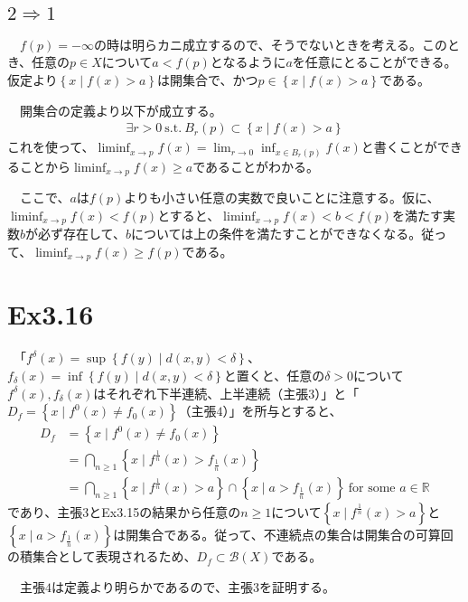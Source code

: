 \documentclass{article}
\begin{document}
\subsection{$2\Rightarrow 1$}
　$f(p) = -\infty$の時は明らカニ成立するので、そうでないときを考える。このとき、任意の$p\in X$について$a < f(p)$となるように$a$を任意にとることができる。仮定より$\left\{ x\mid f(x) > a \right\}$は開集合で、かつ$p \in \left\{ x\mid f(x) > a \right\}$である。

　開集合の定義より以下が成立する。
\begin{align*}
	\exists r>0\ \text{s.t.}\ B_{r}(p) \subset \left\{ x\mid f(x) > a \right\}
\end{align*}
これを使って、$\liminf_{x\to p} f(x) = \lim_{r\to 0} \inf_{x\in B_{r}(p)} f(x)$と書くことができることから$\liminf_{x\to p} f(x) \geq a$であることがわかる。

　ここで、$a$は$f(p)$よりも小さい任意の実数で良いことに注意する。仮に、$\liminf_{x\to p} f(x) < f(p)$とすると、$\liminf_{x\to p} f(x) < b < f(p)$を満たす実数$b$が必ず存在して、$b$については上の条件を満たすことができなくなる。従って、$\liminf_{x\to p} f(x) \geq f(p)$である。

\section{Ex3.16}
　「$f^{\delta}(x) = \sup\left\{ f(y)\mid d(x,y) <\delta \right\}$、$f_{\delta}(x) = \inf\left\{ f(y)\mid d(x,y) <\delta \right\}$と置くと、任意の$\delta > 0$について$f^{\delta}(x), f_{\delta}(x)$はそれぞれ下半連続、上半連続（主張$3$）」と「$D_f = \left\{ x \mid f^0(x) \neq f_0(x)\right\}$（主張$4$）」を所与とすると、
\begin{align*}
	D_f &= \left\{ x \mid f^0(x) \neq f_0(x)\right\}\\
	& = \bigcap_{n\geq 1} \left\{ x \mid f^{\frac{1}{n}}(x) > f_{\frac{1}{n}}(x)\right\}\\
	& = \bigcap_{n\geq 1} \left\{ x \mid f^{\frac{1}{n}}(x) > a\right\} \cap \left\{ x\mid a >  f_{\frac{1}{n}}(x)\right\}\ \text{for some $a\in \mathbb{R}$}
\end{align*}
であり、主張$3$とEx3.15の結果から任意の$n\geq 1$について$\left\{ x \mid f^{\frac{1}{n}}(x) > a\right\}$と$\left\{ x \mid a > f_{\frac{1}{n}}(x) \right\}$は開集合である。従って、不連続点の集合は開集合の可算回の積集合として表現されるため、$D_f \subset \mathcal{B}(X)$である。

　主張$4$は定義より明らかであるので、主張$3$を証明する。
\end{document}
